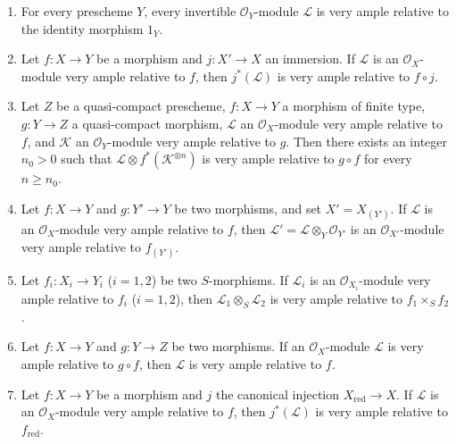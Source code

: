 \begin{proposition}[4.4.10]
\label{II.4.4.10}
\begin{enumerate}
  \item[\rm{(i)}] For every prescheme $Y$, every invertible
  $\mathcal{O}_Y$-module $\mathcal{L}$ is very ample relative to the identity
  morphism $1_Y$.
  \item[\rm{(i bis)}] Let $f:X\to Y$ be a morphism and $j:X'\to X$ an
  immersion. If $\mathcal{L}$ is an $\mathcal{O}_X$-module very ample
  relative to $f$, then $j^*(\mathcal{L})$ is very ample relative to
  $f\circ j$.
  \item[\rm{(ii)}] Let $Z$ be a quasi-compact prescheme, $f:X\to Y$ a
  morphism of finite type, $g:Y\to Z$ a quasi-compact morphism,
  $\mathcal{L}$ an $\mathcal{O}_X$-module very ample relative to $f$, and
  $\mathcal{K}$ an $\mathcal{O}_Y$-module very ample relative to $g$.
  Then there exists an integer $n_0>0$ such that
  $\mathcal{L}\otimes f^*(\mathcal{K}^{\otimes n})$ is very ample
  relative to $g\circ f$ for every $n\geq n_0$.
  \item[\rm{(iii)}] Let $f:X\to Y$ and $g:Y'\to Y$ be two morphisms, and set
  $X'=X_{(Y')}$. If $\mathcal{L}$ is an $\mathcal{O}_X$-module very ample
  relative to $f$, then $\mathcal{L}'=\mathcal{L}\otimes_Y\mathcal{O}_{Y'}$
  is an $\mathcal{O}_{X'}$-module very ample relative to $f_{(Y')}$.
  \item[\rm{(iv)}] Let $f_i:X_i\to Y_i$ ($i=1,2$) be two $S$-morphisms.
  If $\mathcal{L}_i$ is an $\mathcal{O}_{X_i}$-module very ample relative
  to $f_i$ ($i=1,2$), then $\mathcal{L}_1\otimes_S\mathcal{L}_2$ is very ample
  relative to $f_1\times_Sf_2$.
  \item[\rm{(v)}] Let $f:X\to Y$ and $g:Y\to Z$ be two morphisms. If an
  $\mathcal{O}_X$-module $\mathcal{L}$ is very ample relative to
  $g\circ f$, then $\mathcal{L}$ is very ample relative to $f$.
  \item[\rm{(vi)}] Let $f:X\to Y$ be a morphism and $j$ the canonical
  injection $X_{\mathrm{red}}\to X$. If $\mathcal{L}$ is an
  $\mathcal{O}_X$-module very ample relative to $f$, then $j^*(\mathcal{L})$
  is very ample relative to $f_{\mathrm{red}}$.
\end{enumerate}
\end{proposition}


